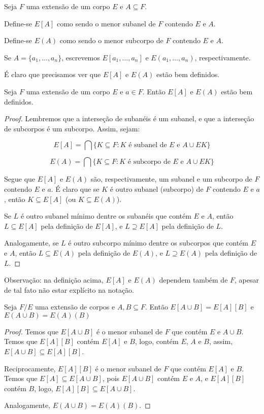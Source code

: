 \begin{definition}
    Seja $F$ uma extensão de um corpo $E$ e $A \subseteq F$.

    Define-se $E[A]$ como sendo o menor subanel de $F$ contendo $E$ e $A$.

    Define-se $E(A)$ como sendo o menor subcorpo de $F$ contendo $E$ e $A$.

    Se $A=\{a_1, \dots, a_n\}$, escrevemos $E[a_1, \dots, a_n]$ e $E(a_1, \dots, a_n)$, respectivamente.
\end{definition}

É claro que precisamos ver que $E[A]$ e $E(A)$ estão bem definidos.

\begin{lemma}
    Seja $F$ uma extensão de um corpo $E$ e $a \in F$. Então $E[A]$ e $E(A)$ estão bem definidos.
\end{lemma}

\begin{proof}
    Lembremos que a interseção de subanéis é um subanel, e que a interseção de subcorpos é um subcorpo. Assim, sejam:

    \[E[A]=\bigcap\{K\subseteq F: K \text{ é subanel de } E \text{ e } A\cup E K\}\]

    \[E(A)=\bigcap\{K\subseteq F: K \text{ é subcorpo de } E \text{ e } A\cup E K\}\]

    Segue que $E[A]$ e $E(A)$ são, respectivamente, um subanel e um subcorpo de $F$ contendo $E$ e $a$.
    É claro que se $K$ é outro subanel (subcorpo) de $F$ contendo $E$ e $a$, então $K\subseteq E[A]$ (ou $K\subseteq E(A)$). 

    Se $L$ é outro subanel mínimo dentre os subanéis que contém $E$ e $A$, então $L\subseteq E[A]$ pela definição de $E[A]$, e $L\supseteq E[A]$ pela definição de $L$.

    Analogamente, se $L$ é outro subcorpo mínimo dentre os subcorpos que contém $E$ e $A$, então $L\subseteq E(A)$ pela definição de $E(A)$, e $L\supseteq E(A)$ pela definição de $L$.
\end{proof}
Observação: na definição acima, $E[A]$ e $E(A)$ dependem também de $F$, apesar de tal fato não estar explícito na notação.
\begin{lemma}
Seja $F/E$ uma extensão de corpos e $A, B \subseteq F$. Então $E[A\cup B]=E[A][B]$ e $E(A\cup B)=E(A)(B)$
\end{lemma}
\begin{proof}
    Temos que $E[A\cup B]$ é o menor subanel de $F$ que contém $E$ e $A\cup B$. Temos que $E[A][B]$ contém $E[A]$ e $B$, logo, contém $E$, $A$ e $B$, assim, $E[A\cup B]\subseteq E[A][B]$.

    Reciprocamente, $E[A][B]$ é o menor subanel de $F$ que contém $E[A]$ e $B$. Temos que $E[A]\subseteq E[A\cup B]$, pois $E[A\cup B]$ contém $E$ e $A$, e $E[A][B]$ contém $B$, logo, $E[A][B]\subseteq E[A\cup B]$.

    Analogamente, $E(A\cup B)=E(A)(B)$.
\end{proof}

